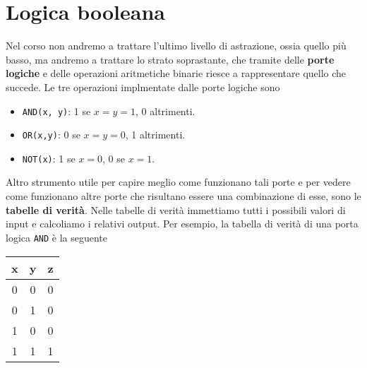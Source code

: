 \section{Logica booleana}
Nel corso non andremo a trattare l'ultimo livello di astrazione, ossia quello più basso, ma andremo
a trattare lo strato soprastante, che tramite delle \textbf{porte logiche} e delle operazioni
aritmetiche binarie riesce a rappresentare quello che succede. Le tre operazioni implmentate dalle
porte logiche sono
\begin{itemize}
	\item \verb|AND(x, y)|: 1 se $x = y = 1$, 0 altrimenti.
	\item \verb|OR(x,y)|: 0 se $x = y = 0$, 1 altrimenti.
	\item \verb|NOT(x)|: 1 se $x = 0$, 0 se $x = 1$.
\end{itemize}
Altro strumento utile per capire meglio come funzionano tali porte e per vedere come funzionano
altre porte che risultano essere una combinazione di esse, sono le \textbf{tabelle di verità}.
Nelle tabelle di verità immettiamo tutti i possibili valori di input e calcoliamo i relativi output.
Per esempio, la tabella di verità di una porta logica \verb|AND| è la seguente
\begin{center}
	\begin{tabular}{c c | c}
		x & y & z \\ \hline
		0 & 0 & 0 \\
		0 & 1 & 0 \\
		1 & 0 & 0 \\
		1 & 1 & 1
	\end{tabular}
\end{center}